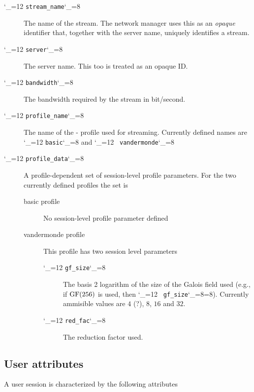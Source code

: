 \documentclass[a4paper,10pt]{medusabook}
\def\ttt{\catcode`\_=12 \tttii}
\def\tttii#1!{{\tt #1}\catcode`\_=8{}}
\begin{document}
\begin{description}
\item[\ttt stream\_name!]  The name of the stream.  The network manager uses
  this as an \emph{opaque} identifier that, together with the server
  name, uniquely identifies a stream.
\item[\ttt server!] The server name.  This too is treated as an opaque ID.
\item[\ttt bandwidth!] The  bandwidth required by the stream in bit/second.  
\item[\ttt profile\_name!] The name of the \ppetp- profile used for
  streaming.  Currently defined names are \ttt basic! and \ttt
  vandermonde! 
\item[\ttt profile\_data!] A profile-dependent set of session-level
  profile parameters.   For the two currently defined profiles the set
  is
  \begin{description}
    \item[basic profile] No session-level profile parameter defined
    \item[vandermonde profile] This profile has two session level
    parameters
    \begin{description}
      \item[\ttt gf\_size!] The basis 2 logarithm of the size of the
      Galois field used (e.g., if $\operatorname{GF}(256)$ is used, then \ttt
      gf\_size!=8). Currently ammisible values are $4$ (?), $8$, $16$
      and $32$.
      \item[\ttt red\_fac!] The reduction factor used.
    \end{description}
  \end{description}
\end{description}

\subsection{User attributes}
\label{sub:0.0.1;protocol}

A user session is characterized by the following attributes
\end{document}
